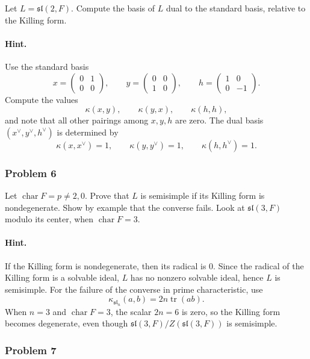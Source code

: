 \documentclass[12pt, a4paper]{article}
\begin{document}
Let \(L=\mathfrak{sl}(2,F)\). Compute the basis of \(L\) dual to the standard
basis, relative to the Killing form.

\paragraph{Hint.}
Use the standard basis
\[
x=
\begin{pmatrix}
0&1\\
0&0
\end{pmatrix},
\qquad
y=
\begin{pmatrix}
0&0\\
1&0
\end{pmatrix},
\qquad
h=
\begin{pmatrix}
1&0\\
0&-1
\end{pmatrix}.
\]
Compute the values
\[
\kappa(x,y),\qquad \kappa(y,x),\qquad \kappa(h,h),
\]
and note that all other pairings among \(x,y,h\) are zero. The dual basis
\((x^\vee,y^\vee,h^\vee)\) is determined by
\[
\kappa(x,x^\vee)=1,\qquad
\kappa(y,y^\vee)=1,\qquad
\kappa(h,h^\vee)=1.
\]

\subsubsection{Problem 6}

Let \(\operatorname{char}F=p\neq 2,0\). Prove that \(L\) is semisimple if its
Killing form is nondegenerate. Show by example that the converse fails. Look at
\(\mathfrak{sl}(3,F)\) modulo its center, when \(\operatorname{char}F=3\).

\paragraph{Hint.}
If the Killing form is nondegenerate, then its radical is \(0\). Since the
radical of the Killing form is a solvable ideal, \(L\) has no nonzero solvable
ideal, hence \(L\) is semisimple. For the failure of the converse in prime
characteristic, use
\[
\kappa_{\mathfrak{sl}_n}(a,b)=2n\operatorname{tr}(ab).
\]
When \(n=3\) and \(\operatorname{char}F=3\), the scalar \(2n=6\) is zero, so the
Killing form becomes degenerate, even though
\(\mathfrak{sl}(3,F)/Z(\mathfrak{sl}(3,F))\) is semisimple.

\subsubsection{Problem 7}
\end{document}

